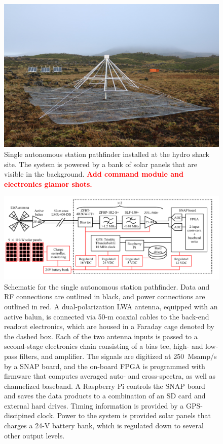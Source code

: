\documentclass{ws-jai}
\begin{document}
\begin{figure}
  \begin{center}
    \includegraphics[width=0.7\linewidth]{Figures/autonomous.jpg}
    \caption{Single autonomous station pathfinder installed at the
      hydro shack site.  The system is powered by a bank of solar
      panels that are visible in the background.  \textcolor{red}{\bf
        Add command module and electronics glamor shots.}}
    \label{Fig:autonomous}
  \end{center}
\end{figure}

\begin{figure}
  \begin{center}
    \includegraphics[width=\linewidth]{Figures/albatros_single_schematic/albatros_single_schematic.pdf}
    \caption{Schematic for the single autonomous station pathfinder.
      Data and RF connections are outlined in black, and power
      connections are outlined in red.  A dual-polarization LWA
      antenna, equipped with an active balun, is connected via 50-m
      coaxial cables to the back-end readout electronics, which are
      housed in a Faraday cage denoted by the dashed box.  Each of the
      two antenna inputs is passed to a second-stage electronics chain
      consisting of a bias tee, high- and low-pass filters, and
      amplifier.  The signals are digitized at 250~Msamp/s by a SNAP
      board, and the on-board FPGA is programmed with firmware that
      computes averaged auto- and cross-spectra, as well as
      channelized baseband.  A Raspberry Pi controls the SNAP board
      and saves the data products to a combination of an SD card and
      external hard drives.  Timing information is provided by a
      GPS-discipined clock.  Power to the system is provided solar
      panels that charges a 24-V battery bank, which is regulated down
      to several other output levels.}
    \label{Fig:Signal Chain}
  \end{center}
\end{figure}
\end{document}
